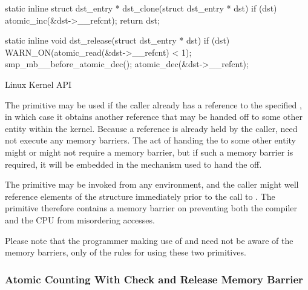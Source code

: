 \begin{listing}[tbp]
\begin{fcvlabel}
\begin{VerbatimL}[commandchars=\\\[\]]
static inline
struct dst_entry * dst_clone(struct dst_entry * dst)
{
	if (dst)
		atomic_inc(&dst->__refcnt);
	return dst;
}

static inline
void dst_release(struct dst_entry * dst)
{
	if (dst) {
		WARN_ON(atomic_read(&dst->__refcnt) < 1);
		smp_mb__before_atomic_dec();		\lnlbl[mb]
		atomic_dec(&dst->__refcnt);
	}
}
\end{VerbatimL}
\end{fcvlabel}
\caption{Linux Kernel  API}
\label{lst:together:Linux Kernel dst-clone API}
\end{listing}

The  primitive may be used if the caller
already has a reference to the specified ,
in which case it obtains another reference that may be handed off
to some other entity within the kernel.
Because a reference is already held by the caller, 
need not execute any memory barriers.
The act of handing the  to some other entity might
or might not require a memory barrier, but if such a memory barrier
is required, it will be embedded in the mechanism used to hand the
 off.

\begin{fcvref}
The  primitive may be invoked from any environment,
and the caller might well reference elements of the 
structure immediately prior to the call to .
The  primitive therefore contains a memory
barrier on  preventing both the compiler and the CPU
from misordering accesses.
\end{fcvref}

Please note that the programmer making use of  and
 need not be aware of the memory barriers, only
of the rules for using these two primitives.

\subsubsection{Atomic Counting With Check and Release Memory Barrier}
\label{sec:together:Atomic Counting With Check and Release Memory Barrier}

